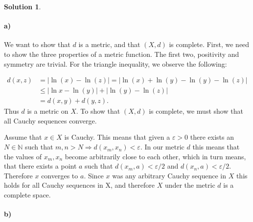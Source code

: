 \documentclass[a4paper]{article}
\theoremstyle{definition}
\newtheorem{sol}{Solution}
\begin{document}
\begin{sol}
\item\paragraph{a)}
We want to show that $d$ is a metric, and that $\left( X, d \right)$ is
complete.  First, we need to show the three properties of a metric function.
The first two, positivity and symmetry are trivial.  For the triangle
inequality, we observe the following:

\begin{align*}
  d(x, z) &= | \ln(x) - \ln(z)| = | \ln(x) + \ln(y) - \ln(y) - \ln(z) | \\
          &\leq |\ln x - \ln(y) | + |\ln(y) - \ln(z) | \\
          &= d(x, y) + d(y, z).
\end{align*}
Thus $d$ is a metric on $X$. To show that $\left( X, d \right)$ is complete, we
must show that all Cauchy sequences converge.

Assume that $x \in X$ is Cauchy. This means that given a $\varepsilon > 0$
there exists an $N \in \mathbb{N}$ such that $m, n > N \Longrightarrow d(x_m,
x_n) < \varepsilon$. In our metric $d$ this means that the values of $x_m, x_n$
become arbitrarily close to each other, which in turn means, that there exists
a point $a$ such that $d(x_m, a) < \varepsilon/2$ and $d(x_n, a) <
\varepsilon/2$. Therefore $x$ converges to $a$.  Since $x$ was any arbitrary
Cauchy sequence in $X$ this holds for all Cauchy sequences in X, and therefore
$X$ under the metric $d$ is a complete space.

\paragraph{b)}


\end{sol}
\end{document}
